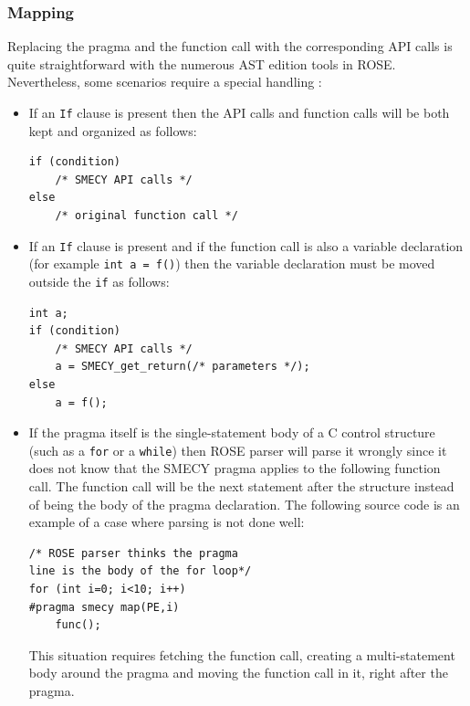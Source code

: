 \documentclass[a4paper]{article}
\begin{document}
	\subsubsection{Mapping} Replacing the pragma and the function call with the corresponding API calls is quite straightforward with the numerous AST edition tools in ROSE. Nevertheless, some scenarios require a special handling :
	\begin{itemize}
		\item If an \verb+If+ clause is present then the API calls and
          function calls will be both kept and organized as follows:
		\begin{lstlisting}[frame=none, numbers=none]
if (condition)
	/* SMECY API calls */
else
	/* original function call */
		\end{lstlisting}
		\item If an \verb+If+ clause is present and if the function call is also a variable declaration (for example \verb+int a = f()+) then the variable declaration must be moved outside the \verb+if+ as follows:
		\begin{lstlisting}[frame=none, numbers=none]
int a;
if (condition)
	/* SMECY API calls */
	a = SMECY_get_return(/* parameters */);
else
	a = f();
		\end{lstlisting}
		\item If the pragma itself is the single-statement body of a C control 
          structure  (such as a \verb+for+ or a \verb+while+) then ROSE parser will parse it wrongly since it
          does not know that the SMECY pragma applies to the following
          function call. The function call will be the next statement
          after the structure instead of being the body of the pragma
          declaration. The following source code is an example of a case where parsing is not done well:
          \begin{lstlisting}[frame=none, numbers=none]
/* ROSE parser thinks the pragma
line is the body of the for loop*/
for (int i=0; i<10; i++)
#pragma smecy map(PE,i)
	func();
		\end{lstlisting}

		This situation requires fetching the function call, creating a multi-statement body around the pragma and moving the function call in it, right after the pragma.
	\end{itemize}
	
\end{document}
